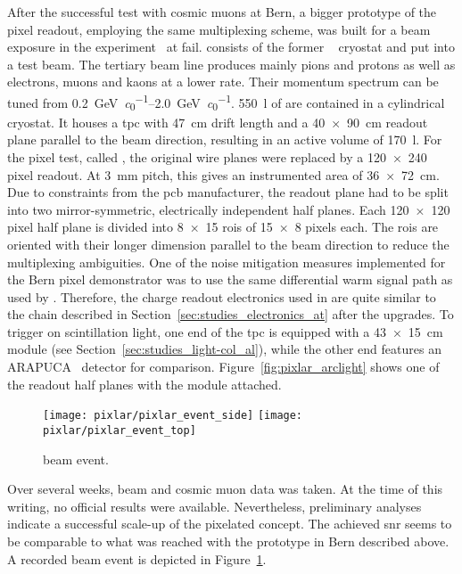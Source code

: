 After the successful test with cosmic muons at Bern, a bigger prototype of the pixel readout, employing the same multiplexing scheme, was built for a beam exposure in the \lariat{} experiment~\cite{lariat} at \gls{fail}.
\lariat{} consists of the former \argoneut{}~\cite{argoneut} cryostat and \lartpc{} put into a test beam.
The tertiary beam line produces mainly pions and protons as well as electrons, muons and kaons at a lower rate.
Their momentum spectrum can be tuned from \SIrange{0.2}{2.0}{\giga\electronvolt\per\clight}.
\SI{550}{\litre} of \lar{} are contained in a cylindrical cryostat.
It houses a \gls{tpc} with \SI{47}{\centi\metre} drift length and a \SI{40 x 90}{\centi\metre} readout plane parallel to the beam direction, resulting in an active volume of \SI{170}{\litre}.
For the pixel test, called \pixlar{}, the original wire planes were replaced by a \num{120 x 240} pixel readout.
At \SI{3}{\milli\metre} pitch, this gives an instrumented area of \SI{36 x 72}{\centi\metre}.
Due to constraints from the \gls{pcb} manufacturer, the readout plane had to be split into two mirror-symmetric, electrically independent half planes.
Each \num{120 x 120} pixel half plane is divided into \num{8 x 15} \glspl{roi} of \num{15 x 8} pixels each.
The \glspl{roi} are oriented with their longer dimension parallel to the beam direction to reduce the multiplexing ambiguities.
One of the noise mitigation measures implemented for the Bern pixel demonstrator was to use the same differential warm signal path as used by \lariat{}.
Therefore, the charge readout electronics used in \pixlar{} are quite similar to the \AT{} chain described in Section~\ref{sec:studies_electronics_at} after the upgrades.
To trigger on scintillation light, one end of the \gls{tpc} is equipped with a \SI{43 x 15}{\centi\metre} \AL{} module (see Section~\ref{sec:studies_light-col_al}), while the other end features an ARAPUCA~\cite{arapuca} detector for comparison.
Figure~\ref{fig:pixlar_arclight} shows one of the readout half planes with the \AL{} module attached.

\begin{figure}[htb]
	\centering
	\texttt{[image: pixlar/pixlar\_event\_side]}
	\texttt{[image: pixlar/pixlar\_event\_top]}
	\caption{\pixlar{} beam event.}
	\label{fig:pixlar_event}
\end{figure}

Over several weeks, beam and cosmic muon data was taken.
At the time of this writing, no official results were available.
Nevertheless, preliminary analyses indicate a successful scale-up of the pixelated \lartpc{} concept.
The achieved \gls{snr} seems to be comparable to what was reached with the prototype in Bern described above.
A recorded beam event is depicted in Figure~\ref{fig:pixlar_event}.